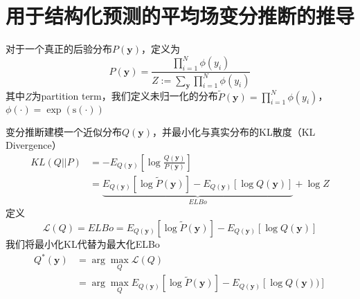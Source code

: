 \chapter{用于结构化预测的平均场变分推断的推导}
\label{appendix:mfvi-derivation}
对于一个真正的后验分布$P(\boldsymbol{y})$，定义为
\begin{equation}\label{eq:posterior}
  P(\boldsymbol{y}) =\frac{\prod_{i=1}^{N} \phi(y_i)}{Z:=\sum_{\boldsymbol{y}}\prod_{i=1}^{N} \phi(y_i)}
\end{equation}
其中$Z$为partition term，我们定义未归一化的分布$\tilde{P}(\boldsymbol{y})=\prod_{i=1}^{N} \phi(y_i)$，$\phi(\cdot)=\exp(\mathrm{s}(\cdot))$

变分推断建模一个近似分布$Q(\boldsymbol{y})$，并最小化与真实分布的KL散度（KL Divergence）
\begin{equation}
  \begin{split}
    KL(Q||P)
    &=-E_{Q(\boldsymbol{y})}\left[\log\frac{Q(\boldsymbol{y})}{P(\boldsymbol{y})}\right]\\
    &=\underbrace{E_{Q(\boldsymbol{y})}\left[\log \tilde{P}(\boldsymbol{y})\right]-E_{Q(\boldsymbol{y})}\left[\log Q(\boldsymbol{y})\right]}_{ELBo}+\log Z
  \end{split}
\end{equation}
定义
\begin{equation}
  \mathcal{L}(Q)=ELBo=E_{Q(\boldsymbol{y})}\left[\log \tilde{P}(\boldsymbol{y})\right]-E_{Q(\boldsymbol{y})}\left[\log Q(\boldsymbol{y})\right]
\end{equation}
我们将最小化KL代替为最大化ELBo
\begin{equation}
  \begin{split}
    Q^{\ast}(\boldsymbol{y}) &= \arg\max_{Q}\mathcal{L}(Q)\\
    &= \arg\max_{Q}E_{Q(\boldsymbol{y})}\left[\log \tilde{P}(\boldsymbol{y})\right]-E_{Q(\boldsymbol{y})}\left[\log Q(\boldsymbol{y}))\right]
  \end{split}
\end{equation}



